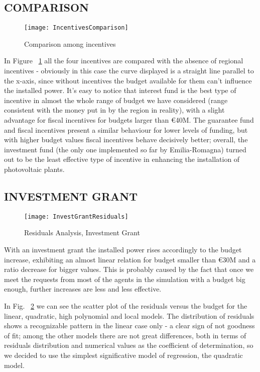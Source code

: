 \documentclass [twocolumn,a4paper,10pt]{ECMS}
\newcommand{\Subsection}[1]{\subsection*{#1}\vspace*{-0.7em}}
\begin{document}
\Subsection{COMPARISON}

\begin{figure}[hbt]
	\centering
	\texttt{[image: IncentivesComparison]}
	\caption{Comparison among incentives}
	\label{IncentivesComparison}
\end{figure}

In Figure ~\ref{IncentivesComparison} all the four incentives are compared with the absence of regional incentives - obviously in this case the curve displayed is a straight line parallel to the x-axis, since without incentives the budget available for them can't influence the installed power. It's easy to notice that interest fund is the best type of incentive in almost the whole range of budget we have considered (range consistent with the money put in by the region in reality), with a slight advantage for fiscal incentives for budgets larger than \euro40M. The guarantee fund and fiscal incentives present a similar behaviour for lower levels of funding, but with higher budget values fiscal incentives behave decisively better; overall, the investment fund (the only one implemented so far by Emilia-Romagna) turned out to be the least effective type of incentive in enhancing the installation of photovoltaic plants.

\Subsection{INVESTMENT GRANT}

\begin{figure}[hbt]
	\centering
	\texttt{[image: InvestGrantResiduals]}
	\caption{Residuals Analysis, Investment Grant}
	\label{InvestGrantResiduals}
\end{figure}

With an investment grant the installed power rises accordingly to the budget increase, exhibiting an almost linear relation for budget smaller than \euro30M and a ratio decrease for bigger values. This is probably caused by the fact that once we meet the requests from most of the agents in the simulation with a budget big enough, further increases are less and less effective. 

In Fig. ~\ref{InvestGrantResiduals} we can see the scatter plot of the residuals versus the budget for the linear, quadratic, high polynomial and local models. The distribution of residuals shows a recognizable pattern in the linear case only - a clear sign of not goodness of fit; among the other models there are not great differences, both in terms of residuals distribution and numerical values as the coefficient of determination, so we decided to use the simplest significative model of regression, the quadratic model. 
\end{document}
